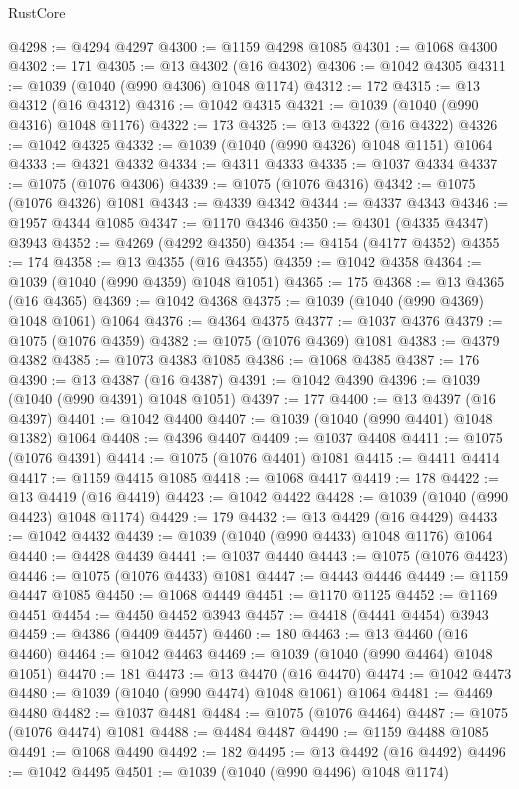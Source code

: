 \begin{lexlean}{RustCore}
\begin{coremodule}
@4298 := @4294 @4297
@4300 := @1159 @4298 @1085
@4301 := @1068 @4300
@4302 := 171
@4305 := @13 @4302 (@16 @4302)
@4306 := @1042 @4305
@4311 := @1039 (@1040 (@990 @4306) @1048 @1174)
@4312 := 172
@4315 := @13 @4312 (@16 @4312)
@4316 := @1042 @4315
@4321 := @1039 (@1040 (@990 @4316) @1048 @1176)
@4322 := 173
@4325 := @13 @4322 (@16 @4322)
@4326 := @1042 @4325
@4332 := @1039 (@1040 (@990 @4326) @1048 @1151) @1064
@4333 := @4321 @4332
@4334 := @4311 @4333
@4335 := @1037 @4334
@4337 := @1075 (@1076 @4306)
@4339 := @1075 (@1076 @4316)
@4342 := @1075 (@1076 @4326) @1081
@4343 := @4339 @4342
@4344 := @4337 @4343
@4346 := @1957 @4344 @1085
@4347 := @1170 @4346
@4350 := @4301 (@4335 @4347) @3943
@4352 := @4269 (@4292 @4350)
@4354 := @4154 (@4177 @4352)
@4355 := 174
@4358 := @13 @4355 (@16 @4355)
@4359 := @1042 @4358
@4364 := @1039 (@1040 (@990 @4359) @1048 @1051)
@4365 := 175
@4368 := @13 @4365 (@16 @4365)
@4369 := @1042 @4368
@4375 := @1039 (@1040 (@990 @4369) @1048 @1061) @1064
@4376 := @4364 @4375
@4377 := @1037 @4376
@4379 := @1075 (@1076 @4359)
@4382 := @1075 (@1076 @4369) @1081
@4383 := @4379 @4382
@4385 := @1073 @4383 @1085
@4386 := @1068 @4385
@4387 := 176
@4390 := @13 @4387 (@16 @4387)
@4391 := @1042 @4390
@4396 := @1039 (@1040 (@990 @4391) @1048 @1051)
@4397 := 177
@4400 := @13 @4397 (@16 @4397)
@4401 := @1042 @4400
@4407 := @1039 (@1040 (@990 @4401) @1048 @1382) @1064
@4408 := @4396 @4407
@4409 := @1037 @4408
@4411 := @1075 (@1076 @4391)
@4414 := @1075 (@1076 @4401) @1081
@4415 := @4411 @4414
@4417 := @1159 @4415 @1085
@4418 := @1068 @4417
@4419 := 178
@4422 := @13 @4419 (@16 @4419)
@4423 := @1042 @4422
@4428 := @1039 (@1040 (@990 @4423) @1048 @1174)
@4429 := 179
@4432 := @13 @4429 (@16 @4429)
@4433 := @1042 @4432
@4439 := @1039 (@1040 (@990 @4433) @1048 @1176) @1064
@4440 := @4428 @4439
@4441 := @1037 @4440
@4443 := @1075 (@1076 @4423)
@4446 := @1075 (@1076 @4433) @1081
@4447 := @4443 @4446
@4449 := @1159 @4447 @1085
@4450 := @1068 @4449
@4451 := @1170 @1125
@4452 := @1169 @4451
@4454 := @4450 @4452 @3943
@4457 := @4418 (@4441 @4454) @3943
@4459 := @4386 (@4409 @4457)
@4460 := 180
@4463 := @13 @4460 (@16 @4460)
@4464 := @1042 @4463
@4469 := @1039 (@1040 (@990 @4464) @1048 @1051)
@4470 := 181
@4473 := @13 @4470 (@16 @4470)
@4474 := @1042 @4473
@4480 := @1039 (@1040 (@990 @4474) @1048 @1061) @1064
@4481 := @4469 @4480
@4482 := @1037 @4481
@4484 := @1075 (@1076 @4464)
@4487 := @1075 (@1076 @4474) @1081
@4488 := @4484 @4487
@4490 := @1159 @4488 @1085
@4491 := @1068 @4490
@4492 := 182
@4495 := @13 @4492 (@16 @4492)
@4496 := @1042 @4495
@4501 := @1039 (@1040 (@990 @4496) @1048 @1174)

\end{coremodule}
\end{lexlean}
